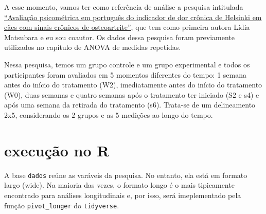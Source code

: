 \documentclass[
]{book}
\begin{document}
A esse momento, vamos ter como referência de análise a pesquisa
intitulada
\href{https://www.scielo.br/scielo.php?script=sci_arttext\&pid=S0102-09352019000100109}{``Avaliação
psicométrica em português do indicador de dor crônica de Helsinki em
cães com sinais crônicos de osteoartrite''}, que tem como primeira
autora Lídia Matsubara e eu sou coautor. Os dados dessa pesquisa foram
previamente utilizados no capítulo de ANOVA de medidas repetidas.

Nessa pesquisa, temos um grupo controle e um grupo experimental e todos
os participantes foram avaliados em 5 momentos diferentes do tempo: 1
semana antes do início do tratamento (W2), imediatamente antes do início
do tratamento (W0), duas semanas e quatro semanas após o tratamento ter
iniciado (S2 e s4) e após uma semana da retirada do tratamento (s6).
Trata-se de um delineamento 2x5, considerando os 2 grupos e as 5
medições ao longo do tempo.

\hypertarget{execuuxe7uxe3o-no-r-11}{%
\section{execução no R}\label{execuuxe7uxe3o-no-r-11}}

A base \texttt{dados} reúne as varáveis da pesquisa. No entanto, ela
está em formato largo (wide). Na maioria das vezes, o formato longo é o
mais tipicamente encontrado para análises longitudinais e, por isso,
será imeplementado pela função \texttt{pivot\_longer} do
\texttt{tidyverse}.
\end{document}
